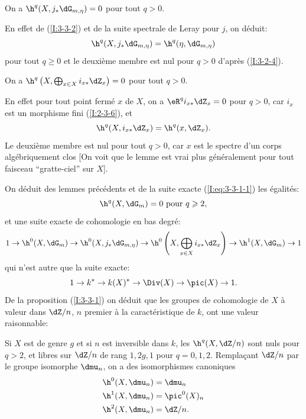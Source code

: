 \begin{lemmadotdash}\label{I:3-3-3}
On a $\h^q(X, j_*\dG_{m,\eta}) = 0$ pour tout $q>0$.
\end{lemmadotdash}

En effet de (\ref{I:3-3-2}) et de la suite spectrale de Leray pour $j$, on 
déduit:
\[
  \h^q(X, j_* \dG_{m,\eta}) = \h^q(\eta,\dG_{m,\eta})
\]
pour tout $q\geqslant 0$ et le deuxième membre est nul pour $q>0$ d'après 
(\ref{I:3-2-4}). 





\begin{lemmadotdash}\label{I:3-3-4}
On a $\h^q\left(X,\bigoplus_{x\in X} i_{x*} \dZ_x\right) = 0$ pour tout $q>0$. 
\end{lemmadotdash}

En effet pour tout point fermé $x$ de $X$, on a $\eR^q i_{x*}\dZ_x = 0$ pour $q>0$, 
car $i_x$ est un morphisme fini (\ref{I:2-3-6}), et 
\[
  \h^q(X,i_{x*}\dZ_x) = \h^q(x,\dZ_x)\text{.}
\]
Le deuxième membre est nul pour tout $q>0$, car $x$ est le spectre d'un 
corps algébriquement clos [On voit que le lemme est vrai plus 
généralement pour tout faisceau ``gratte-ciel'' sur $X$]. 

On déduit des lemmes précédents et de la suite exacte (\ref{I:eq:3-3-1-1}) 
les égalités:
\[
  \h^q(X,\dG_m) = 0 \text{ pour $q\geqslant 2$,}
\]
et une suite exacte de cohomologie en bas degré:
\[
  1 \to \h^0(X,\dG_m) \to \h^0(X, j_*\dG_{m,\eta}) \to \h^0\left(X,\bigoplus_{x\in X} i_{x*}\dZ_x\right) \to \h^1(X,\dG_m) \to 1
\]
qui n'est autre que la suite exacte:
\[
  1 \to k^* \to k(X)^*\to \Div(X) \to \pic(X) \to 1\text{.}
\]
De la proposition (\ref{I:3-3-1}) on déduit que les groupes de cohomologie de 
$X$ à valeur dans $\dZ/n$, $n$ premier à la caractéristique de $k$, ont 
une valeur raisonnable:





\begin{corollarydash}\label{I:3-3-5}
Si $X$ est de genre $g$ et si $n$ est inversible dans $k$, les 
$\h^q(X,\dZ/n)$ sont nuls pour $q>2$, et libres sur $\dZ/n$ de rang $1,2g,1$ 
pour $q=0,1,2$. Remplaçant $\dZ/n$ par le groupe isomorphe $\dmu_n$, on a des 
isomorphismes canoniques 
\begin{align*}
  \h^0(X,\dmu_n) &= \dmu_n \\
  \h^1(X,\dmu_n) &= \pic^0(X)_n \\
  \h^2(X,\dmu_n) &= \dZ/n \text{.}
\end{align*}
\end{corollarydash}

